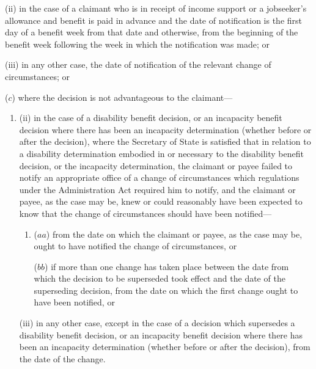 \documentclass[12pt,a4paper]{article}
\begin{document}
\begin{enumerate}
\begin{enumerate}
(ii) in the case of a claimant who is in receipt of income support or a jobseeker’s allowance and benefit is paid in advance and the date of notification is the first day of a benefit week from that date and otherwise, from the beginning of the benefit week following the week in which the notification was made; or

(iii) in any other case, the date of notification of the relevant change of circumstances; or
\end{enumerate}

($c$) where the decision is not advantageous to the claimant—
\begin{enumerate}\item[]


(ii) in the case of a disability benefit decision, or an incapacity benefit decision where there has been an incapacity determination (whether before or after the decision), where the Secretary of State is satisfied that in relation to a disability determination embodied in or necessary to the disability benefit decision, or the incapacity determination, the claimant or payee failed to notify an appropriate office of a change of circumstances which regulations under the Administration Act required him to notify, and the claimant or payee, as the case may be, knew or could reasonably have been expected to know that the change of circumstances should have been notified---
\begin{enumerate}\item[]
($aa$) from the date on which the claimant or payee, as the case may be, ought to have notified the change of circumstances, or

($bb$) if more than one change has taken place between the date from which the decision to be superseded took effect and the date of the superseding decision, from the date on which the first change ought to have been notified, or
\end{enumerate}

(iii) in any other case, except in the case of a decision which supersedes a disability benefit decision, or an incapacity benefit decision where there has been an incapacity determination (whether before or after the decision), from the date of the change.
\end{enumerate}
\end{enumerate}
\end{document}
